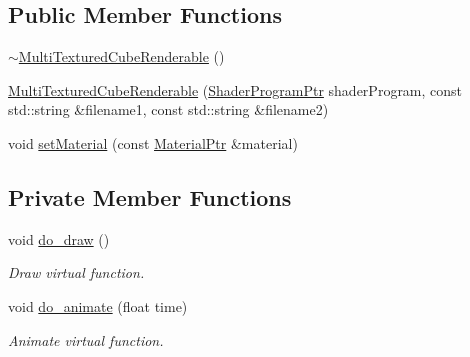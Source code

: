\subsection*{Public Member Functions}
\begin{DoxyCompactItemize}
\item 
\hyperlink{classMultiTexturedCubeRenderable_a8ded5e8d9273ed29dfbd8e07be48e883}{$\sim$\+Multi\+Textured\+Cube\+Renderable} ()
\item 
\hyperlink{classMultiTexturedCubeRenderable_a1abd417c2cbe9e71ad409e2f807bcf02}{Multi\+Textured\+Cube\+Renderable} (\hyperlink{ShaderProgram_8hpp_af8e4af1ad4c53875ee5d32ab7e1f4966}{Shader\+Program\+Ptr} shader\+Program, const std\+::string \&filename1, const std\+::string \&filename2)
\item 
void \hyperlink{classMultiTexturedCubeRenderable_a799f37e64905b22f1622d7492ebd3de0}{set\+Material} (const \hyperlink{Material_8hpp_a1d47cd05ca683e287435cf0b363fbfe1}{Material\+Ptr} \&material)
\end{DoxyCompactItemize}
\subsection*{Private Member Functions}
\begin{DoxyCompactItemize}
\item 
void \hyperlink{classMultiTexturedCubeRenderable_a3dafc49b8a8b6b5f9ed2928c91c2cd6f}{do\+\_\+draw} ()
\begin{DoxyCompactList}\small\item\em Draw virtual function. \end{DoxyCompactList}\item 
void \hyperlink{classMultiTexturedCubeRenderable_a1db1e5f6c10f62874aef22e346906979}{do\+\_\+animate} (float time)
\begin{DoxyCompactList}\small\item\em Animate virtual function. \end{DoxyCompactList}\end{DoxyCompactItemize}

